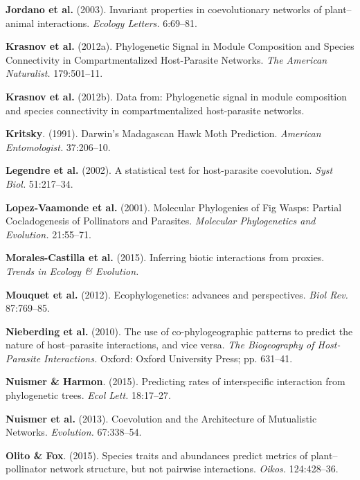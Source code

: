 \documentclass[11pt,serif]{article}
\begin{document}
\hypertarget{ref-jord03ipc}{}
\textbf{Jordano et al.} (2003). Invariant properties in coevolutionary
networks of plant--animal interactions. \emph{Ecology Letters.}
6:69--81.

\hypertarget{ref-kras12psm}{}
\textbf{Krasnov et al.} (2012a). Phylogenetic Signal in Module
Composition and Species Connectivity in Compartmentalized Host-Parasite
Networks. \emph{The American Naturalist.} 179:501--11.

\hypertarget{ref-kras12dfp}{}
\textbf{Krasnov et al.} (2012b). Data from: Phylogenetic signal in
module composition and species connectivity in compartmentalized
host-parasite networks.

\hypertarget{ref-krit91dmh}{}
\textbf{Kritsky}. (1991). Darwin's Madagascan Hawk Moth Prediction.
\emph{American Entomologist.} 37:206--10.

\hypertarget{ref-lege02sth}{}
\textbf{Legendre et al.} (2002). A statistical test for host-parasite
coevolution. \emph{Syst Biol.} 51:217--34.

\hypertarget{ref-lope01mpf}{}
\textbf{Lopez-Vaamonde et al.} (2001). Molecular Phylogenies of Fig
Wasps: Partial Cocladogenesis of Pollinators and Parasites.
\emph{Molecular Phylogenetics and Evolution.} 21:55--71.

\hypertarget{ref-mora15ibi}{}
\textbf{Morales-Castilla et al.} (2015). Inferring biotic interactions
from proxies. \emph{Trends in Ecology \& Evolution.}

\hypertarget{ref-mouq12eap}{}
\textbf{Mouquet et al.} (2012). Ecophylogenetics: advances and
perspectives. \emph{Biol Rev.} 87:769--85.

\hypertarget{ref-nieb10ucp}{}
\textbf{Nieberding et al.} (2010). The use of co-phylogeographic
patterns to predict the nature of host--parasite interactions, and vice
versa. \emph{The Biogeography of Host-Parasite Interactions.} Oxford:
Oxford University Press; pp. 631--41.

\hypertarget{ref-nuis15pri}{}
\textbf{Nuismer \& Harmon}. (2015). Predicting rates of interspecific
interaction from phylogenetic trees. \emph{Ecol Lett.} 18:17--27.

\hypertarget{ref-nuis13cam}{}
\textbf{Nuismer et al.} (2013). Coevolution and the Architecture of
Mutualistic Networks. \emph{Evolution.} 67:338--54.

\hypertarget{ref-olit15staa}{}
\textbf{Olito \& Fox}. (2015). Species traits and abundances predict
metrics of plant--pollinator network structure, but not pairwise
interactions. \emph{Oikos.} 124:428--36.
\end{document}
